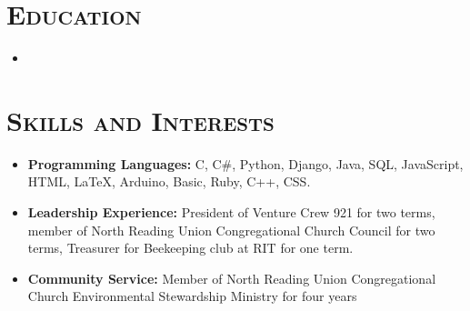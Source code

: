 \documentclass[10pt,letter,roman]{moderncv}
\begin{document}
\section{\textsc{Education}}


\begin{itemize}
\item{}
\end{itemize}


\section{\textsc{Skills and Interests}}


\begin{itemize}

\item \textbf{Programming Languages:} C, C\#, Python, Django, Java, SQL, JavaScript, HTML, LaTeX, Arduino, Basic, Ruby, C++, CSS.
\vspace{5pt}
\item \textbf{Leadership Experience:} President of Venture Crew 921 for two terms, member of North Reading Union Congregational Church Council for two terms, Treasurer for Beekeeping club at RIT for one term.
\vspace{5pt}
\item \textbf{Community Service:} Member of North Reading Union Congregational Church Environmental Stewardship Ministry for four years

\end{itemize}
\end{document}

